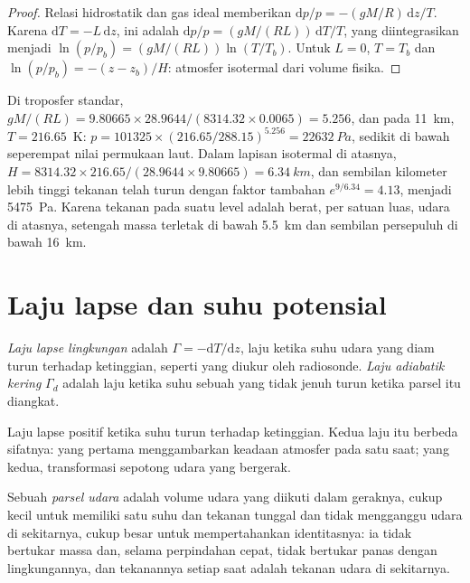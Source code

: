 \begin{proof}
Relasi hidrostatik dan gas ideal memberikan $\mathrm dp/p = -(gM/R)\,\mathrm
dz/T$. Karena $\mathrm dT = -L\,\mathrm dz$, ini adalah $\mathrm dp/p =
(gM/(RL))\,\mathrm dT/T$, yang diintegrasikan menjadi $\ln(p/p_b) = (gM/(RL))
\ln(T/T_b)$. Untuk $L = 0$, $T = T_b$ dan $\ln(p/p_b) = -(z - z_b)/H$: atmosfer isotermal dari volume fisika.
\end{proof}

Di troposfer standar, $gM/(RL) = 9.80665 \times 28.9644 /
(8314.32 \times 0.0065) = 5.256$, dan pada \qty{11}{km}, $T = 216.65$~K:
$p = \num{101325} \times (216.65/288.15)^{5.256} = \qty{22632}{Pa}$, sedikit di bawah seperempat nilai permukaan laut. Dalam lapisan isotermal di atasnya, $H =
8314.32 \times 216.65/(28.9644 \times 9.80665) = \qty{6.34}{km}$, dan sembilan kilometer lebih tinggi tekanan telah turun dengan faktor tambahan $e^{9/6.34} =
4.13$, menjadi \qty{5475}{Pa}. Karena tekanan pada suatu level adalah berat, per satuan luas, udara di atasnya, setengah massa  terletak di bawah \qty{5.5}{km} dan sembilan persepuluh di bawah \qty{16}{km}.

\section{Laju lapse dan suhu potensial}\label{sec:b1:fluid-envelopes-structure:lapse}

\begin{definition}\label{def:b1:fluid-envelopes-structure:lapse-rate}
\emph{Laju lapse lingkungan} adalah $\Gamma =
-\mathrm dT/\mathrm dz$, laju ketika suhu udara yang diam turun terhadap ketinggian, seperti yang diukur oleh radiosonde. \emph{Laju adiabatik kering} $\Gamma_d$ adalah laju ketika suhu sebuah  yang tidak jenuh turun ketika parsel itu diangkat.
\end{definition}

Laju lapse positif ketika suhu turun terhadap ketinggian. Kedua laju itu berbeda sifatnya: yang pertama menggambarkan keadaan atmosfer pada satu saat; yang kedua, transformasi sepotong udara yang bergerak.

\begin{definition}\label{def:b1:fluid-envelopes-structure:parcel}
Sebuah \emph{parsel udara} adalah volume udara yang diikuti dalam geraknya, cukup kecil untuk memiliki satu suhu dan tekanan tunggal dan tidak mengganggu udara di sekitarnya, cukup besar untuk mempertahankan identitasnya: ia tidak bertukar massa dan, selama perpindahan cepat, tidak bertukar panas dengan lingkungannya, dan tekanannya setiap saat adalah tekanan udara di sekitarnya.
\end{definition}

